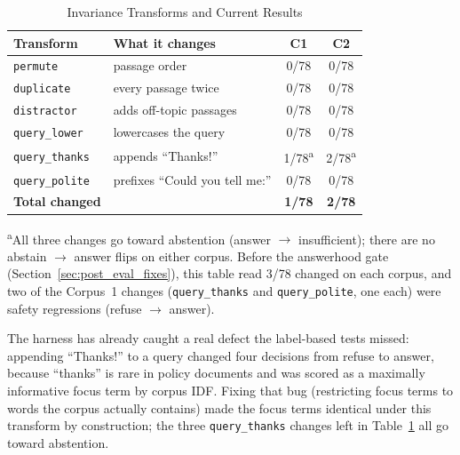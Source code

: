 \documentclass[conference]{IEEEtran}
\begin{document}
\begin{table}[htbp]
\caption{Invariance Transforms and Current Results}
\label{tab:invariance}
\centering
\small
\begin{tabularx}{\columnwidth}{@{}l X c c@{}}
\toprule
Transform & What it changes & C1 & C2 \\
\midrule
\texttt{permute}      & passage order              & 0/78 & 0/78 \\
\texttt{duplicate}    & every passage twice        & 0/78 & 0/78 \\
\texttt{distractor}   & adds off-topic passages    & 0/78 & 0/78 \\
\texttt{query\_lower} & lowercases the query       & 0/78 & 0/78 \\
\texttt{query\_thanks}& appends ``Thanks!''        & 1/78\textsuperscript{a} & 2/78\textsuperscript{a} \\
\texttt{query\_polite}& prefixes ``Could you tell me:'' & 0/78 & 0/78 \\
\midrule
\textbf{Total changed} & & \textbf{1/78} & \textbf{2/78} \\
\bottomrule
\end{tabularx}

\vspace{3pt}
\raggedright\scriptsize
\textsuperscript{a}All three changes go toward abstention (answer $\to$
insufficient); there are no abstain $\to$ answer flips on either corpus.
Before the answerhood gate (Section~\ref{sec:post_eval_fixes}), this table
read 3/78 changed on each corpus, and two of the Corpus~1 changes
(\texttt{query\_thanks} and \texttt{query\_polite}, one each) were safety
regressions (refuse $\to$ answer).


\end{table}

The harness has already caught a real defect the label-based tests
missed: appending ``Thanks!'' to a query changed four decisions from
refuse to answer, because ``thanks'' is rare in policy documents and
was scored as a maximally informative focus term by corpus IDF. Fixing
that bug (restricting focus terms to words the corpus actually contains)
made the focus terms identical under this transform by construction; the
three \texttt{query\_thanks} changes left in Table~\ref{tab:invariance} all
go toward abstention.
\end{document}
